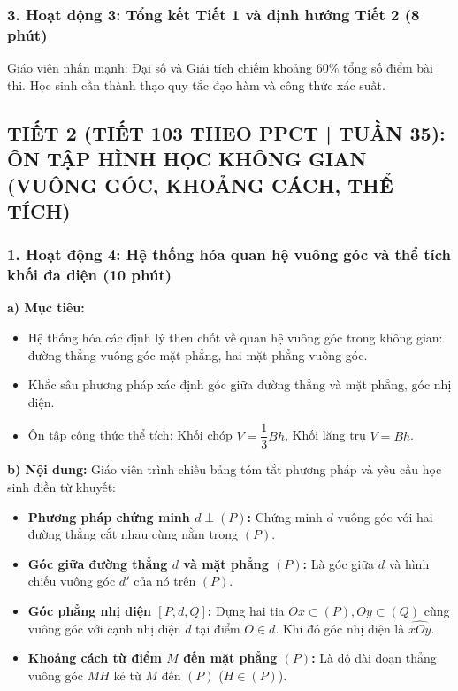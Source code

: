 \documentclass[12pt, a4paper]{article}
\begin{document}
\subsubsection*{3. Hoạt động 3: Tổng kết Tiết 1 và định hướng Tiết 2 (8 phút)}
Giáo viên nhấn mạnh: Đại số và Giải tích chiếm khoảng 60\% tổng số điểm bài thi. Học sinh cần thành thạo quy tắc đạo hàm và công thức xác suất.

\vspace{10pt}

\subsection*{TIẾT 2 (TIẾT 103 THEO PPCT | TUẦN 35): ÔN TẬP HÌNH HỌC KHÔNG GIAN (VUÔNG GÓC, KHOẢNG CÁCH, THỂ TÍCH)}

\subsubsection*{1. Hoạt động 4: Hệ thống hóa quan hệ vuông góc và thể tích khối đa diện (10 phút)}

\noindent \textbf{a) Mục tiêu:}
\begin{itemize}[leftmargin=0.6cm]
    \item Hệ thống hóa các định lý then chốt về quan hệ vuông góc trong không gian: đường thẳng vuông góc mặt phẳng, hai mặt phẳng vuông góc.
    \item Khắc sâu phương pháp xác định góc giữa đường thẳng và mặt phẳng, góc nhị diện.
    \item Ôn tập công thức thể tích: Khối chóp $V = \dfrac{1}{3}Bh$, Khối lăng trụ $V = Bh$.
\end{itemize}

\noindent \textbf{b) Nội dung:}
Giáo viên trình chiếu bảng tóm tắt phương pháp và yêu cầu học sinh điền từ khuyết:
\begin{itemize}[leftmargin=0.6cm]
    \item \textbf{Phương pháp chứng minh $d \perp (P)$:} Chứng minh $d$ vuông góc với hai đường thẳng cắt nhau cùng nằm trong $(P)$.
    \item \textbf{Góc giữa đường thẳng $d$ và mặt phẳng $(P)$:} Là góc giữa $d$ và hình chiếu vuông góc $d'$ của nó trên $(P)$.
    \item \textbf{Góc phẳng nhị diện $[P, d, Q]$:} Dựng hai tia $Ox \subset (P), Oy \subset (Q)$ cùng vuông góc với cạnh nhị diện $d$ tại điểm $O \in d$. Khi đó góc nhị diện là $\widehat{xOy}$.
    \item \textbf{Khoảng cách từ điểm $M$ đến mặt phẳng $(P)$:} Là độ dài đoạn thẳng vuông góc $MH$ kẻ từ $M$ đến $(P)$ ($H \in (P)$).
\end{itemize}
\end{document}
